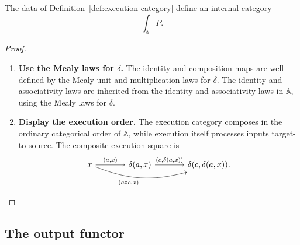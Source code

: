 \begin{proposition}
\label{prop:execution-category}
    The data of Definition~\ref{def:execution-category} define an internal category
    \[
        \int_{\mathbb A}P.
    \]
\end{proposition}
\begin{proof}
    \leavevmode
    \begin{enumerate}
        \item \textbf{Use the Mealy laws for \(\delta\).} The identity and composition maps are well-defined by the Mealy unit and multiplication laws for \(\delta\). The identity and associativity laws are inherited from the identity and associativity laws in \(\mathbb A\), using the Mealy laws for \(\delta\).

        \item \textbf{Display the execution order.} The execution category composes in the ordinary categorical order of \(\mathbb A\), while execution itself processes inputs target-to-source. The composite execution square is
        \[
            \begin{tikzcd}[column sep=large, row sep=large]
                    x
                        \arrow[r, "{(a,x)}"]
                        \arrow[rr, "{(a\circ c,x)}"', bend right=18]
                &
                    \delta(a,x)
                        \arrow[r, "{(c,\delta(a,x))}"]
                &
                    \delta(c,\delta(a,x)).
            \end{tikzcd}
        \]
    \end{enumerate}
\end{proof}

\subsection{The output functor}
\label{subsec:output-functor}

